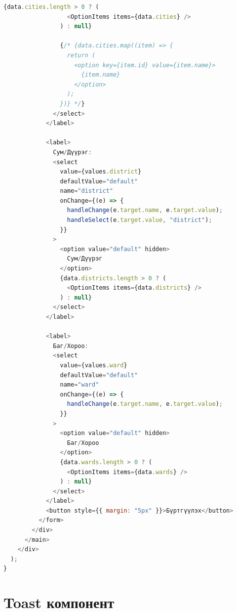 \begin{lstlisting}[language=Javascript, frame=single]
                {data.cities.length > 0 ? (
                  <OptionItems items={data.cities} />
                ) : null}

                {/* {data.cities.map((item) => {
                  return (
                    <option key={item.id} value={item.name}>
                      {item.name}
                    </option>
                  );
                })} */}
              </select>
            </label>

            <label>
              Сум/Дүүрэг:
              <select
                value={values.district}
                defaultValue="default"
                name="district"
                onChange={(e) => {
                  handleChange(e.target.name, e.target.value);
                  handleSelect(e.target.value, "district");
                }}
              >
                <option value="default" hidden>
                  Сум/Дүүрэг
                </option>
                {data.districts.length > 0 ? (
                  <OptionItems items={data.districts} />
                ) : null}
              </select>
            </label>

            <label>
              Баг/Хороо:
              <select
                value={values.ward}
                defaultValue="default"
                name="ward"
                onChange={(e) => {
                  handleChange(e.target.name, e.target.value);
                }}
              >
                <option value="default" hidden>
                  Баг/Хороо
                </option>
                {data.wards.length > 0 ? (
                  <OptionItems items={data.wards} />
                ) : null}
              </select>
            </label>
            <button style={{ margin: "5px" }}>Бүртгүүлэх</button>
          </form>
        </div>
      </main>
    </div>
  );
}
\end{lstlisting}

\section{Toast компонент}

